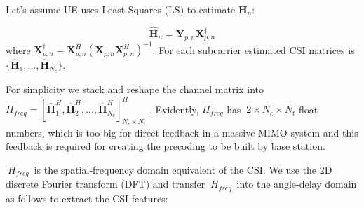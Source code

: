 \documentclass[lettersize,journal]{IEEEtran}
\begin{document}
Let's assume UE uses Least Squares (LS) to estimate \begin{math} \textbf{H}_{n} \end{math}:


\begin{equation}
	\hat{\textbf{H}}_{n}=\textbf{Y}_{p,n}\textbf{X}^{\dag}_{p,n}
\end{equation}
where \begin{math} \textbf{X}_{p,n}^{\dag}= \textbf{X}^{H}_{p,n}(\textbf{X}_{p,n}\textbf{X}^{H}_{p,n})^{-1} \end{math}.
For each subcarrier estimated CSI matrices is 
\begin{math}
	\{  \hat{\textbf{H}}_{1},...,\hat{\textbf{H}}_{N_{c}} \}
\end{math}.




For simplicity we stack and reshape the channel matrix into
\begin{math}
	H_{freq}=\left[\hat{\textbf{H}}_{1}^{H},\hat{\textbf{H}}_{2}^{H},...,\hat{\textbf{H}}_{N_{c}}^{H}\right]^{H}_{N_{c}\times N_{t}}
\end{math}
. Evidently, \begin{math} H_{freq}\end{math} has \begin{math}\ 2\times N_{c}\times N_{t}\end{math} float numbers, which is too big for direct feedback in a massive MIMO system and this feedback is required for creating
the precoding to be built by base station.

\begin{math}\ H_{freq}\end{math} is the spatial-frequency domain equivalent of the CSI. We use the 2D discrete Fourier transform (DFT) and transfer \begin{math}\ H_{freq}\end{math} into the angle-delay domain as follows to extract the CSI features:
\end{document}
